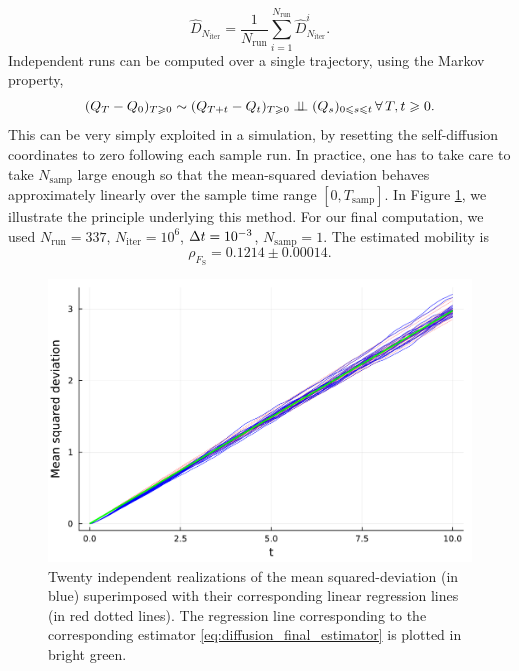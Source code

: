     \begin{equation}
        \label{eq:diffusion_final_estimator}
        \widehat{D}_{N_{\mathrm{iter}}}=\frac{1}{N_{\mathrm{run}}}\sum_{i=1}^{N_{\mathrm{run}}}\widehat{D}^i_{N_{\mathrm{iter}}}.
    \end{equation}
    Independent runs can be computed over a single trajectory, using the Markov property,
    \[(Q_T-Q_0)_{T\geqslant 0} \sim (Q_{T+t}-Q_t)_{T\geqslant 0} \mathrel{\perp\!\!\!\perp} (Q_s)_{0\leqslant s\leqslant t}\,\forall\,T,t\geqslant 0.\]
    This can be very simply exploited in a simulation, by resetting the self-diffusion coordinates to zero following each sample run. 
    In practice, one has to take care to take $N_{\mathrm{samp}}$ large enough so that the mean-squared deviation behaves approximately linearly over the sample time range $[0,T_{\mathrm{samp}}]$.
    In Figure \ref{fig:einstein_demo}, we illustrate the principle underlying this method. 
    For our final computation, we used $N_{\mathrm{run}}=337$, $N_{\mathrm{iter}}=10^6$, ${\Delta t}=10^{-3}$, $N_{\mathrm{samp}}=1$.
    The estimated mobility is 
    \begin{equation}
        \label{eq:einstein_est_mobility}
        \rho_{F_{\mathrm{S}}}=0.1214\pm 0.00014.
    \end{equation}

\begin{figure}[htbp]
    \begin{center}
      \includegraphics[width=0.8\linewidth]{figures/einstein_demo.pdf}
      \caption{ \label{fig:einstein_demo}
        Twenty independent realizations of the mean squared-deviation (in blue) superimposed with their corresponding linear regression lines (in red dotted lines).
        The regression line corresponding to the corresponding estimator \eqref{eq:diffusion_final_estimator} is plotted in bright green.
      }
    \end{center}
  \end{figure}
